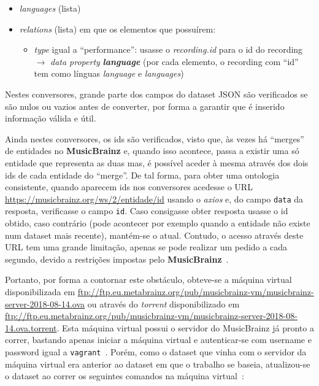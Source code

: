 \documentclass{article}
\begin{document}
\begin{itemize}
\begin{itemize}
            \item \textit{languages} (lista)
            \item \textit{relations} (lista) em que os elementos que possuírem:
                \begin{itemize}
                    \item \textit{type} igual a ``performance'': usasse o \textit{recording.id} para o id do recording $\to$ \textit{data property} \textit{\textbf{language}} (por cada elemento, o recording com ``id'' tem como línguas \textit{language} e \textit{languages})
                \end{itemize}
        \end{itemize}
\end{itemize}

Nestes conversores, grande parte dos campos do dataset JSON são verificados se são nulos ou vazios antes de converter, por forma a garantir que é inserido informação válida e útil.

Ainda nestes conversores, os ids são verificados, visto que, às vezes há ``merges'' de entidades no \textbf{MusicBrainz} e, quando isso acontece, passa a existir uma só entidade que representa as duas mas, é possível aceder à mesma através dos dois ids de cada entidade do ``merge''. De tal forma, para obter uma ontologia consistente, quando aparecem ids nos conversores acedesse o URL \url{https://musicbrainz.org/ws/2/entidade/id} usando o \textit{axios} e, do campo \texttt{data} da resposta, verificasse o campo \texttt{id}. Caso consigasse obter resposta usasse o id obtido, caso contrário (pode acontecer por exemplo quando a entidade não existe num dataset mais recente), mantém-se o atual. Contudo, o acesso através deste URL tem uma grande limitação, apenas se pode realizar um pedido a cada segundo, devido a restrições impostas pelo \textbf{MusicBrainz}~\cite{mbLimit}. 

Portanto, por forma a contornar este obstáculo, obteve-se a máquina virtual disponibilizada em \url{ftp://ftp.eu.metabrainz.org/pub/musicbrainz-vm/musicbrainz-server-2018-08-14.ova} ou através do \textit{torrent} disponibilizado em \url{ftp://ftp.eu.metabrainz.org/pub/musicbrainz-vm/musicbrainz-server-2018-08-14.ova.torrent}. Esta máquina virtual possui o servidor do MusicBrainz já pronto a correr, bastando apenas iniciar a máquina virtual e autenticar-se com username e password igual a \texttt{vagrant}~\cite{mbSetup}. Porém, como o dataset que vinha com o servidor da máquina virtual era anterior ao dataset em que o trabalho se baseia, atualizou-se o dataset ao correr os seguintes comandos na máquina virtual~\cite{mbUpdate}:
\end{document}
